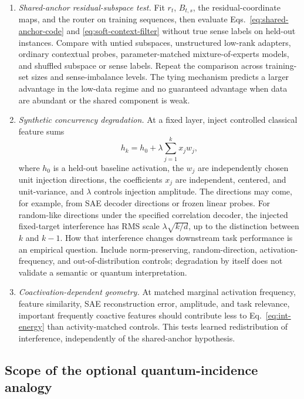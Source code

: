 \documentclass[
  aps,
  reprint,
  superscriptaddress,
  floatfix,
  nofootinbib,
  longbibliography
]{revtex4-2}
\begin{document}
\begin{enumerate}
\item \emph{Shared-anchor residual-subspace test.}
Fit $r_t$, $B_{t,s}$, the residual-coordinate maps, and the router on training
sequences, then evaluate Eqs.~\eqref{eq:shared-anchor-code} and
\eqref{eq:soft-context-filter} without true sense labels on held-out instances.
Compare with untied subspaces, unstructured low-rank adapters, ordinary contextual
probes, parameter-matched mixture-of-experts models, and shuffled subspace or
sense labels.
Repeat the comparison across training-set sizes and sense-imbalance levels.
The tying mechanism predicts a larger advantage in the low-data regime and no
guaranteed advantage when data are abundant or the shared component is weak.

\item \emph{Synthetic concurrency degradation.}
At a fixed layer, inject controlled classical feature sums
%
\begin{equation}
h_k=h_0+\lambda\sum_{j=1}^k x_j w_j,
\end{equation}
%
where $h_0$ is a held-out baseline activation, the $w_j$ are independently
chosen unit injection directions, the coefficients $x_j$ are independent,
centered, and unit-variance, and $\lambda$ controls injection amplitude.  The
directions may come, for example, from SAE decoder directions or frozen linear
probes.  For random-like directions under the specified correlation decoder,
the injected fixed-target interference has RMS scale
$\lambda\sqrt{k/d}$, up to the distinction between $k$ and $k-1$.
How that interference changes downstream task performance is an empirical
question.  Include norm-preserving, random-direction, activation-frequency,
and out-of-distribution controls; degradation by itself does not validate a
semantic or quantum interpretation.

\item \emph{Coactivation-dependent geometry.}
At matched marginal activation frequency, feature similarity, SAE
reconstruction error, amplitude, and task relevance, important frequently
coactive features should contribute less to Eq.~\eqref{eq:int-energy} than
activity-matched controls.  This tests learned redistribution of interference,
independently of the shared-anchor hypothesis.
\end{enumerate}

\subsection{Scope of the optional quantum-incidence analogy}
\label{sec:quantum}
\end{document}

